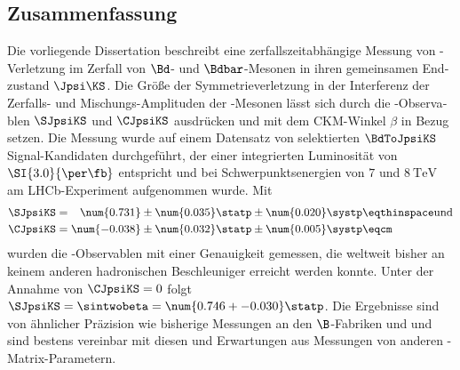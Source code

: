 \vspace{5ex}
\begin{german}
\section*{Zusammenfassung}
Die vorliegende Dissertation beschreibt eine zerfallszeitabhängige Messung von
\CP-Verletzung im Zerfall von $\Bd$- und $\Bdbar$-Mesonen in ihren gemeinsamen
Endzustand $\Jpsi\KS$. Die Größe der Symmetrieverletzung in der Interferenz der
Zerfalls- und Mischungs-Amplituden der \B-Mesonen lässt sich durch die
\CP-Observablen $\SJpsiKS$ und $\CJpsiKS$ ausdrücken und mit dem \acs{CKM}-Winkel
$\beta$ in Bezug setzen. Die Messung wurde auf einem Datensatz von selektierten
$\BdToJpsiKS$ Signal-Kandidaten durchgeführt, der einer integrierten Luminosität
von $\SI{3.0}{\per\fb}$ entspricht und bei Schwerpunktsenergien von $\num{7}$
und $\SI{8}{\TeV}$ am \acs{LHCb}-Experiment aufgenommen wurde. Mit
%
\begin{equation*}
  \begin{split}
    \SJpsiKS &= \phantom{-}\num{0.731} \pm \num{0.035} \statp \pm \num{0.020} \systp \eqthinspace\text{und} \\
    \CJpsiKS &=           \num{-0.038} \pm \num{0.032} \statp \pm \num{0.005} \systp \eqcm
  \end{split}
\end{equation*}
%
wurden die \CP-Observablen mit einer Genauigkeit gemessen, die weltweit bisher
an keinem anderen hadronischen Beschleuniger erreicht werden konnte. Unter der
Annahme von $\CJpsiKS = 0$ folgt $\SJpsiKS = \sintwobeta = \num{0.746 +-
0.030}\statp$. Die Ergebnisse sind von ähnlicher Präzision wie bisherige
Messungen an den $\B$-Fabriken \Babar und \Belle und sind bestens vereinbar mit
diesen und Erwartungen aus Messungen von anderen \CKM-Matrix-Parametern.
\end{german}

\setcounter{page}{1}
